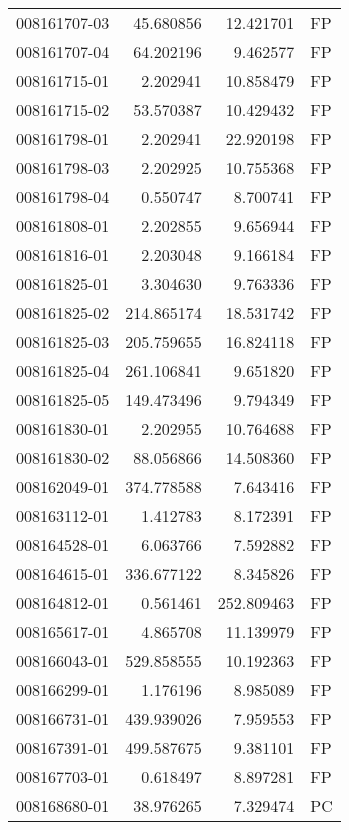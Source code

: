 \begin{tabular}{lrrl}
008161707-03 &   45.680856 &      12.421701 &   FP \\
008161707-04 &   64.202196 &       9.462577 &   FP \\
008161715-01 &    2.202941 &      10.858479 &   FP \\
008161715-02 &   53.570387 &      10.429432 &   FP \\
008161798-01 &    2.202941 &      22.920198 &   FP \\
008161798-03 &    2.202925 &      10.755368 &   FP \\
008161798-04 &    0.550747 &       8.700741 &   FP \\
008161808-01 &    2.202855 &       9.656944 &   FP \\
008161816-01 &    2.203048 &       9.166184 &   FP \\
008161825-01 &    3.304630 &       9.763336 &   FP \\
008161825-02 &  214.865174 &      18.531742 &   FP \\
008161825-03 &  205.759655 &      16.824118 &   FP \\
008161825-04 &  261.106841 &       9.651820 &   FP \\
008161825-05 &  149.473496 &       9.794349 &   FP \\
008161830-01 &    2.202955 &      10.764688 &   FP \\
008161830-02 &   88.056866 &      14.508360 &   FP \\
008162049-01 &  374.778588 &       7.643416 &   FP \\
008163112-01 &    1.412783 &       8.172391 &   FP \\
008164528-01 &    6.063766 &       7.592882 &   FP \\
008164615-01 &  336.677122 &       8.345826 &   FP \\
008164812-01 &    0.561461 &     252.809463 &   FP \\
008165617-01 &    4.865708 &      11.139979 &   FP \\
008166043-01 &  529.858555 &      10.192363 &   FP \\
008166299-01 &    1.176196 &       8.985089 &   FP \\
008166731-01 &  439.939026 &       7.959553 &   FP \\
008167391-01 &  499.587675 &       9.381101 &   FP \\
008167703-01 &    0.618497 &       8.897281 &   FP \\
008168680-01 &   38.976265 &       7.329474 &   PC \\

\end{tabular}
